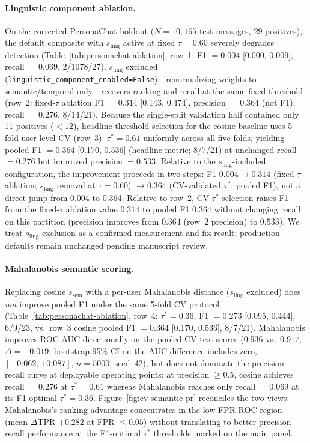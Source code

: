 \paragraph{Linguistic component ablation.}
On the corrected PersonaChat holdout ($N{=}10{,}165$ test messages, 29 positives),
the default composite with $s_{\text{ling}}$ active at fixed $\tau{=}0.60$
severely degrades detection (Table~\ref{tab:personachat-ablation}, row~1:
F1 $=0.004$ [0.000, 0.009], recall $=0.069$, 2/1078/27).
$s_{\text{ling}}$ excluded (\texttt{linguistic\_component\_enabled=False})---renormalizing
weights to semantic/temporal only---recovers ranking and recall at the same
fixed threshold (row~2: fixed-$\tau$ ablation F1 $=0.314$ [0.143, 0.474],
precision $=0.364$ (not F1), recall $=0.276$, 8/14/21).
Because the single-split validation half contained only 11 positives
($<12$), headline threshold selection for the cosine baseline uses 5-fold
user-level CV (row~3): $\tau^*{=}0.61$ uniformly across all five folds,
yielding pooled F1 $=0.364$ [0.170, 0.536] (headline metric; 8/7/21) at
unchanged recall $=0.276$ but improved precision $=0.533$.
Relative to the $s_{\text{ling}}$-included configuration, the improvement
proceeds in two steps: F1 $0.004 \rightarrow 0.314$ (fixed-$\tau$ ablation;
$s_{\text{ling}}$ removal at $\tau{=}0.60$) $\rightarrow 0.364$ (CV-validated
$\tau^*$; pooled F1), not a direct jump from 0.004 to 0.364.
Relative to row~2, CV $\tau^*$ selection raises F1 from the fixed-$\tau$
ablation value $0.314$ to pooled F1 $0.364$ without changing recall on this
partition (precision improves from $0.364$ (row~2 precision) to $0.533$).
We treat $s_{\text{ling}}$ exclusion as a confirmed measurement-and-fix result;
production defaults remain unchanged pending manuscript review.


\paragraph{Mahalanobis semantic scoring.}
Replacing cosine $s_{\text{sem}}$ with a per-user Mahalanobis distance
($s_{\text{ling}}$ excluded) does \emph{not} improve pooled F1 under the
same 5-fold CV protocol (Table~\ref{tab:personachat-ablation}, row~4:
$\tau^*{=}0.36$, F1 $=0.273$ [0.095, 0.444], 6/9/23, vs.\ row~3 cosine
pooled F1 $=0.364$ [0.170, 0.536], 8/7/21).
Mahalanobis improves ROC-AUC directionally on the pooled CV test scores
($0.936$ vs.\ $0.917$, $\Delta{=}+0.019$; bootstrap 95\% CI on the AUC
difference includes zero, $[-0.062, +0.087]$, $n{=}5000$, seed~42), but
does not dominate the precision--recall curve at deployable operating points:
at precision $\geq 0.5$, cosine achieves recall $=0.276$ at $\tau^*{=}0.61$
whereas Mahalanobis reaches only recall $=0.069$ at its F1-optimal
$\tau^*{=}0.36$.
Figure~\ref{fig:cv-semantic-pr} reconciles the two views: Mahalanobis's
ranking advantage concentrates in the low-FPR ROC region (mean $\Delta$TPR
$+0.282$ at FPR $\leq 0.05$) without translating to better precision--recall
performance at the F1-optimal $\tau^*$ thresholds marked on the main panel.

